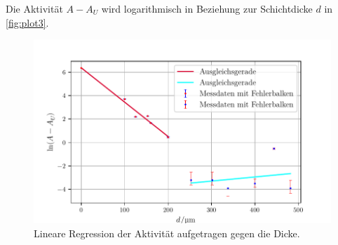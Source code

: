  Die Aktivität $A-A_U$ wird logarithmisch in Beziehung zur Schichtdicke $d$ in \autoref{fig:plot3}.
\begin{figure}[H]
  \centering
  \includegraphics{build/plot3.pdf}
  \caption {Lineare Regression der Aktivität aufgetragen gegen die Dicke.}
  \label{fig:plot3}
\end{figure}

